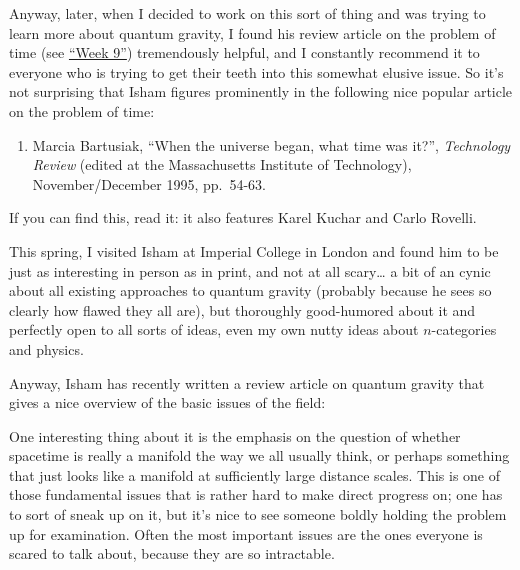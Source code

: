 \documentclass{article}
\def\tightlist{}
\renewcommand{\texttt}[1]{%
  \begingroup
  \ttfamily
  \begingroup\lccode`~=`/\lowercase{\endgroup\def~}{/\discretionary{}{}{}}%
  \begingroup\lccode`~=`[\lowercase{\endgroup\def~}{[\discretionary{}{}{}}%
  \begingroup\lccode`~=`.\lowercase{\endgroup\def~}{.\discretionary{}{}{}}%
  \catcode`/=\active\catcode`[=\active\catcode`.=\active
  \scantokens{#1\noexpand}%
  \endgroup
}
\begin{document}
Anyway, later, when I decided to work on this sort of thing and was
trying to learn more about quantum gravity, I found his review article
on the problem of time (see \protect\hyperlink{week9}{``Week 9''})
tremendously helpful, and I constantly recommend it to everyone who is
trying to get their teeth into this somewhat elusive issue. So it's not
surprising that Isham figures prominently in the following nice popular
article on the problem of time:

\begin{enumerate}
\def\labelenumi{\arabic{enumi})}
\tightlist
\item
  Marcia Bartusiak, ``When the universe began, what time was it?'',
  \emph{Technology Review} (edited at the Massachusetts Institute of
  Technology), November/December 1995, pp.~54-63.
\end{enumerate}

If you can find this, read it: it also features Karel Kuchar and Carlo
Rovelli.

This spring, I visited Isham at Imperial College in London and found him
to be just as interesting in person as in print, and not at all
scary\ldots{} a bit of an cynic about all existing approaches to quantum
gravity (probably because he sees so clearly how flawed they all are),
but thoroughly good-humored about it and perfectly open to all sorts of
ideas, even my own nutty ideas about \(n\)-categories and physics.

Anyway, Isham has recently written a review article on quantum gravity
that gives a nice overview of the basic issues of the field:


One interesting thing about it is the emphasis on the question of
whether spacetime is really a manifold the way we all usually think, or
perhaps something that just looks like a manifold at sufficiently large
distance scales. This is one of those fundamental issues that is rather
hard to make direct progress on; one has to sort of sneak up on it, but
it's nice to see someone boldly holding the problem up for examination.
Often the most important issues are the ones everyone is scared to talk
about, because they are so intractable.
\end{document}
